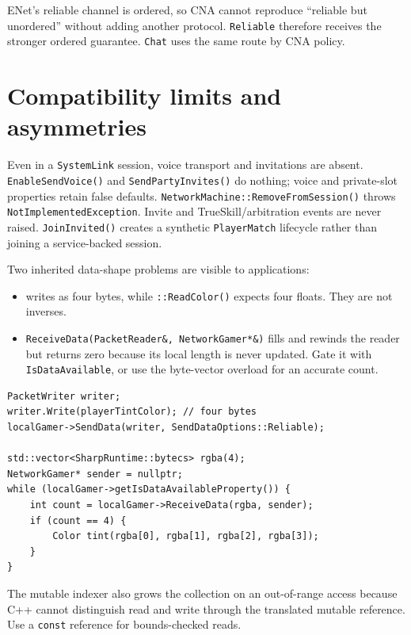 ENet's reliable channel is ordered, so CNA cannot reproduce ``reliable but unordered'' without
adding another protocol. \texttt{Reliable} therefore receives the stronger ordered guarantee.
\texttt{Chat} uses the same route by CNA policy.

\section{Compatibility limits and asymmetries}

Even in a \texttt{SystemLink} session, voice transport and invitations are absent.
\texttt{EnableSendVoice()} and \texttt{SendPartyInvites()} do nothing; voice and private-slot
properties retain false defaults. \texttt{NetworkMachine::RemoveFromSession()} throws
\texttt{NotImplementedException}. Invite and TrueSkill/arbitration events are never raised.
\texttt{JoinInvited()} creates a synthetic \texttt{PlayerMatch} lifecycle rather than joining
a service-backed session.

Two inherited data-shape problems are visible to applications:

\begin{itemize}
  \item {} writes  as four bytes, while
        \texttt{::ReadColor()} expects four floats. They are not inverses.
  \item \texttt{ReceiveData(PacketReader\&, NetworkGamer*\&)} fills and rewinds the reader but
        returns zero because its local length is never updated. Gate it with
        \texttt{IsDataAvailable}, or use the byte-vector overload for an accurate count.
\end{itemize}

\begin{lstlisting}
PacketWriter writer;
writer.Write(playerTintColor); // four bytes
localGamer->SendData(writer, SendDataOptions::Reliable);

std::vector<SharpRuntime::bytecs> rgba(4);
NetworkGamer* sender = nullptr;
while (localGamer->getIsDataAvailableProperty()) {
    int count = localGamer->ReceiveData(rgba, sender);
    if (count == 4) {
        Color tint(rgba[0], rgba[1], rgba[2], rgba[3]);
    }
}
\end{lstlisting}

The mutable  indexer also grows the collection on an
out-of-range access because C++ cannot distinguish read and write through the translated
mutable reference. Use a \texttt{const} reference for bounds-checked reads.

